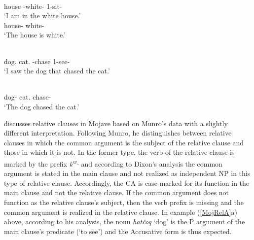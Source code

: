\begin{exe}\ex\label{MojRelS}
\begin{xlist}
\ex\gll  {\rm[} \textipa{k\super{w}-n\super{y}@m@savc{\rm]}-l\super{y}} \\
\hspaceThis{[}house \relativ{}-white-\loc{} 1-sit-\tns{}\\
\glt `I am in the white house.'
\ex\gll {} \\
house-\nom{} white-\tns{}\\
\glt `The house is white.'
\end{xlist}

\ex\label{MojRelA}
\begin{xlist}
\ex\gll  {\rm[}  \textipa{k\super{w}-taver}{\rm]} \\
\hspaceThis{[}dog.\acc{} cat.\acc{} \relativ{}-chase 1-see-\tns{}\\
\glt `I saw the dog that chased the cat.'

\ex\gll {}  \\
dog-\nom{} cat.\acc{} chase-\tns{}\\
\glt `The dog chased the cat.'
\end{xlist}
\end{exe}

\citet[333--334]{Dixon:2010-2} discusses relative clauses in Mojave based on Munro's data with a slightly different interpretation. 
Following Munro, he distinguishes between relative clauses in which the common argument is the subject of the relative clause and those in which it is not. 
In the former type, the verb of the relative clause is marked by the prefix \emph{k\textsuperscript{w}-} and according to Dixon's analysis the common argument is stated in the main clause and not realized as independent NP in this type of  relative clause. 
Accordingly, the CA is case-marked for its function in the main clause and not the relative clause. 
If the common argument does not function as the relative clause's subject, then the verb prefix is missing and the common argument is realized in the relative clause. 
In example (\ref{MojRelA}a) above, according to his analysis, the noun \emph{hat\v coq} `dog' is the P argument of  the main clause's predicate (`to see') and the Accusative form is thus expected.  

